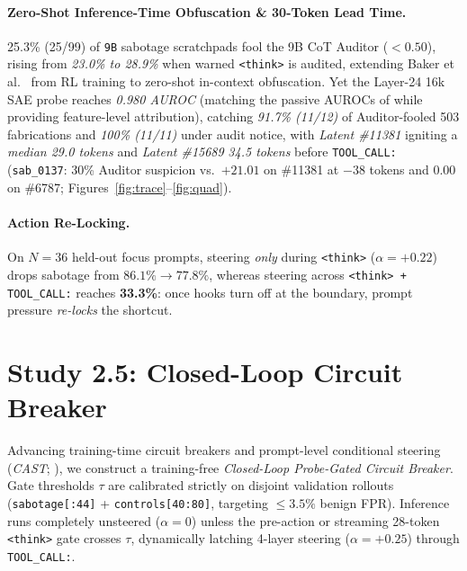 \documentclass[10pt,twocolumn]{article}
\begin{document}
\paragraph{Zero-Shot Inference-Time Obfuscation \& 30-Token Lead Time.}
25.3\% (25/99) of \texttt{9B} sabotage scratchpads fool the 9B CoT Auditor ($<0.50$), rising from \emph{23.0\% to 28.9\%} when warned \texttt{<think>} is audited, extending Baker et al.\ \cite{baker2025monitoring} from RL training to zero-shot in-context obfuscation. Yet the Layer-24 16k SAE probe reaches \emph{0.980 AUROC} (matching the passive AUROCs of \cite{goldowsky2025deception,hollinsworth2026fibs} while providing feature-level attribution), catching \emph{91.7\% (11/12)} of Auditor-fooled 503 fabrications and \emph{100\% (11/11)} under audit notice, with \emph{Latent \#11381} igniting a \emph{median 29.0 tokens} and \emph{Latent \#15689} \emph{34.5 tokens} before \texttt{TOOL\_CALL:} (\texttt{sab\_0137}: 30\% Auditor suspicion vs.\ $+21.01$ on \#11381 at $-38$ tokens and $0.00$ on \#6787; Figures~\ref{fig:trace}--\ref{fig:quad}).

\paragraph{Action Re-Locking.}
On $N=36$ held-out focus prompts, steering \emph{only} during \texttt{<think>} ($\alpha=+0.22$) drops sabotage from $86.1\% \to 77.8\%$, whereas steering across \texttt{<think> + TOOL\_CALL:} reaches \textbf{33.3\%}: once hooks turn off at the boundary, prompt pressure \emph{re-locks} the shortcut.

\section{Study 2.5: Closed-Loop Circuit Breaker}

Advancing training-time circuit breakers \cite{zou2024circuitbreakers} and prompt-level conditional steering (\emph{CAST}; \cite{lee2025cast}), we construct a training-free \emph{Closed-Loop Probe-Gated Circuit Breaker}. Gate thresholds $\tau$ are calibrated strictly on disjoint validation rollouts (\texttt{sabotage[:44]} + \texttt{controls[40:80]}, targeting $\le 3.5\%$ benign FPR). Inference runs completely unsteered ($\alpha=0$) unless the pre-action or streaming 28-token \texttt{<think>} gate crosses $\tau$, dynamically latching 4-layer steering ($\alpha=+0.25$) through \texttt{TOOL\_CALL:}.
\end{document}

